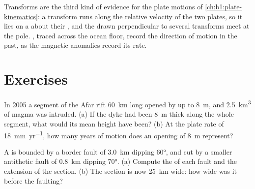 \begin{omfigure}
\par{}
\label{fig:b1:rifts-ridges-margins:transform}
\end{omfigure}

Transforms are the third kind of evidence for the plate motions of
\cref{ch:b1:plate-kinematics}: a transform runs along the relative velocity of
the two plates, so it lies on a  about their , and the
 drawn perpendicular to several transforms meet at the pole.
, traced across the ocean floor, record the direction of motion
in the past, as the magnetic anomalies record its rate.

\section{Exercises}

\begin{exercise}[$\star$]\label{exo:b1:rifts-ridges-margins:1}
In 2005 a segment of the Afar rift \qty{60}{km} long opened by up to
\qty{8}{m}, and \qty{2.5}{km^3} of magma was intruded. (a) If the dyke had
been \qty{8}{m} thick along the whole segment, what would its mean height have
been? (b) At the plate rate of \qty{18}{mm.yr^{-1}}, how many years of motion
does an opening of \qty{8}{m} represent?
\end{exercise}

\begin{exercise}[$\star$]\label{exo:b1:rifts-ridges-margins:2}
A  is bounded by a border fault of  \qty{3.0}{km} dipping
\ang{60}, and cut by a smaller antithetic fault of  \qty{0.8}{km} dipping
\ang{70}. (a) Compute the  of each fault and the extension of the section.
(b) The section is now \qty{25}{km} wide: how wide was it before the faulting?
\end{exercise}

